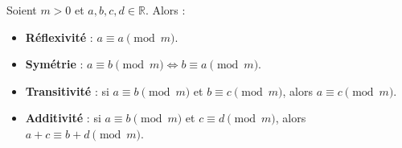 \columnbreak
\begin{f}
	
	Soient $m > 0$ et $a, b, c, d \in \mathbb{R}$. Alors :
	
	\begin{itemize}
		\item \textbf{Réflexivité} : $a \equiv a \pmod{m}$.
		\item \textbf{Symétrie} : $a \equiv b \pmod{m} \iff b \equiv a \pmod{m}$.
		\item \textbf{Transitivité} : si $a \equiv b \pmod{m}$ et $b \equiv c \pmod{m}$, alors $a \equiv c \pmod{m}$.
		\item \textbf{Additivité} : si $a \equiv b \pmod{m}$ et $c \equiv d \pmod{m}$, alors $a + c \equiv b + d \pmod{m}$.
	\end{itemize}
	
\end{f}	

